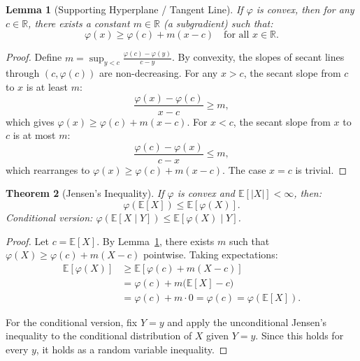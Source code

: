 \documentclass[11pt,a4paper]{article}
\theoremstyle{definition}
\theoremstyle{plain}
\newtheorem{theorem}{Theorem}[section]
\newtheorem{lemma}[theorem]{Lemma}
\theoremstyle{remark}
\newcommand{\E}{\mathbb{E}}
\newcommand{\R}{\mathbb{R}}
\begin{document}
\begin{lemma}[Supporting Hyperplane / Tangent Line]
\label{lem:supporting}
If $\varphi$ is convex, then for any $c \in \R$, there exists a constant $m \in \R$ (a subgradient) such that:
\begin{equation}
    \varphi(x) \geq \varphi(c) + m(x - c) \quad \text{for all } x \in \R.
    \label{eq:supporting}
\end{equation}
\end{lemma}

\begin{proof}
Define $m = \sup_{y < c} \frac{\varphi(c) - \varphi(y)}{c - y}$. By convexity, the slopes of secant lines through $(c, \varphi(c))$ are non-decreasing. For any $x > c$, the secant slope from $c$ to $x$ is at least $m$:
\begin{equation}
    \frac{\varphi(x) - \varphi(c)}{x - c} \geq m,
\end{equation}
which gives $\varphi(x) \geq \varphi(c) + m(x - c)$. For $x < c$, the secant slope from $x$ to $c$ is at most $m$:
\begin{equation}
    \frac{\varphi(c) - \varphi(x)}{c - x} \leq m,
\end{equation}
which rearranges to $\varphi(x) \geq \varphi(c) + m(x - c)$. The case $x = c$ is trivial.
\end{proof}

\begin{keyresult}
\begin{theorem}[Jensen's Inequality]
\label{thm:jensen}
If $\varphi$ is convex and $\E[|X|] < \infty$, then:
\begin{equation}
    \varphi\!\left(\E[X]\right) \leq \E[\varphi(X)].
    \label{eq:jensen}
\end{equation}
Conditional version: $\varphi\!\left(\E[X \mid Y]\right) \leq \E[\varphi(X) \mid Y]$.
\end{theorem}
\end{keyresult}

\begin{proof}
Let $c = \E[X]$. By Lemma~\ref{lem:supporting}, there exists $m$ such that $\varphi(X) \geq \varphi(c) + m(X - c)$ pointwise. Taking expectations:
\begin{align}
    \E[\varphi(X)]
    &\geq \E[\varphi(c) + m(X - c)] \nonumber\\
    &= \varphi(c) + m\bigl(\E[X] - c\bigr) \tag{linearity}\\
    &= \varphi(c) + m \cdot 0 = \varphi(c) = \varphi(\E[X]). \label{eq:jensen_proof}
\end{align}

For the conditional version, fix $Y = y$ and apply the unconditional Jensen's inequality to the conditional distribution of $X$ given $Y = y$. Since this holds for every $y$, it holds as a random variable inequality.
\end{proof}
\end{document}
